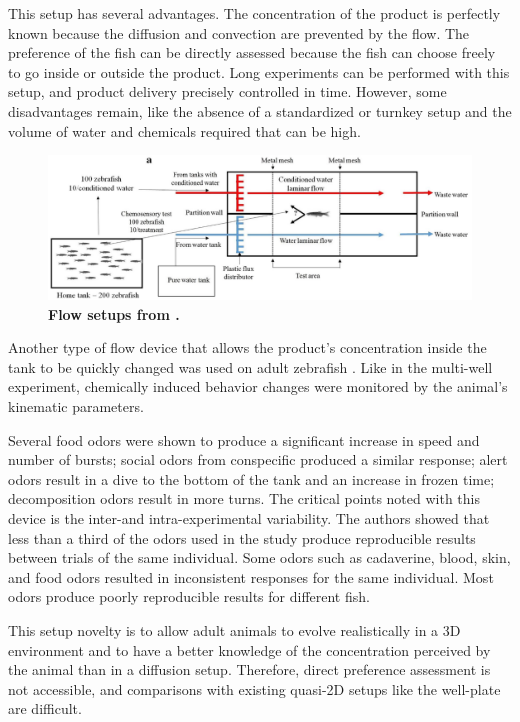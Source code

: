     This setup has several advantages. The concentration of the product is perfectly known because the diffusion and convection are prevented by the flow. The preference of the fish can be directly assessed because the fish can choose freely to go inside or outside the product. Long experiments can be performed with this setup, and product delivery precisely controlled in time. However, some disadvantages remain, like the absence of a standardized or turnkey setup and the volume of water and chemicals required that can be high.

    \begin{figure}[h]
      \centering
      \includegraphics[width=1\textwidth]{part_2/assets/flow_0.png}
      \caption{\textbf{Flow setups from \cite{abreu2016behavioral}.}}
      \label{flow_0_setup}
    \end{figure}

    Another type of flow device that allows the product's concentration inside the tank to be quickly changed was used on adult zebrafish \cite{kermen2020stimulus}. Like in the multi-well experiment, chemically induced behavior changes were monitored by the animal's kinematic parameters.

    Several food odors were shown to produce a significant increase in speed and number of bursts; social odors from conspecific produced a similar response; alert odors result in a dive to the bottom of the tank and an increase in frozen time; decomposition odors result in more turns. The critical points noted with this device is the inter-and intra-experimental variability. The authors showed that less than a third of the odors used in the study produce reproducible results between trials of the same individual. Some odors such as cadaverine, blood, skin, and food odors resulted in inconsistent responses for the same individual. Most odors produce poorly reproducible results for different fish.

    This setup novelty is to allow adult animals to evolve realistically in a 3D environment and to have a better knowledge of the concentration perceived by the animal than in a diffusion setup. Therefore, direct preference assessment is not accessible, and comparisons with existing quasi-2D setups like the well-plate are difficult.

